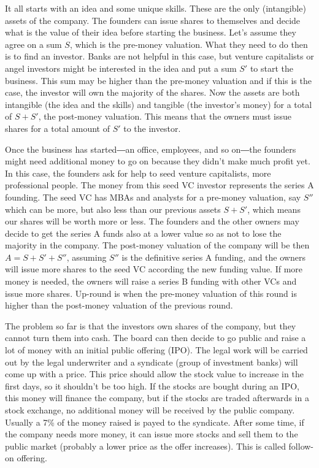 It all starts with an idea and some unique skills. These are the only (intangible) assets of the company. The founders can issue shares to themselves and decide what is the value of their idea before starting the business. Let's assume they agree on a sum $S$, which is the pre-money valuation. What they need to do then is to find an investor. Banks are not helpful in this case, but venture capitalists or angel investors might be interested in the idea and put a sum $S'$ to start the business. This sum may be higher than the pre-money valuation and if this is the case, the investor will own the majority of the shares. Now the assets are both intangible (the idea and the skills) and tangible (the investor's money) for a total of $S + S'$, the post-money valuation. This means that the owners must issue shares for a total amount of $S'$ to the investor. 

Once the business has started―an office, employees, and so on―the founders might need additional money to go on because they didn't make much profit yet. In this case, the founders ask for help to seed venture capitalists, more professional people. The money from this seed VC investor represents the series A founding. The seed VC has MBAs and analysts for a pre-money valuation, say $S''$ which can be more, but also less than our previous assets $S + S'$, which means our shares will be worth more or less. The founders and the other owners may decide to get the series A funds also at a lower value so as not to lose the majority in the company. The post-money valuation of the company will be then $A =S + S' + S''$, assuming $S''$ is the definitive series A funding, and the owners will issue more shares to the seed VC according the new funding value. If more money is needed, the owners will raise a series B funding with other VCs and issue more shares. Up-round is when the pre-money valuation of this round is higher than the post-money valuation of the previous round. 

The problem so far is that the investors own shares of the company, but they cannot turn them into cash. The board can then decide to go public and raise a lot of money with an initial public offering (IPO). The legal work will be carried out by the legal underwriter and a syndicate (group of investment banks) will come up with a price. This price should allow the stock value to increase in the first days, so it shouldn't be too high. If the stocks are bought during an IPO, this money will finance the company, but if the stocks are traded afterwards in a stock exchange, no additional money will be received by the public company. Usually a 7\% of the money raised is payed to the syndicate. After some time, if the company needs more money, it can issue more stocks and sell them to the public market (probably a lower price as the offer increases). This is called follow-on offering.

